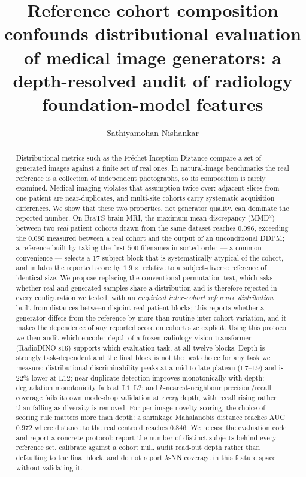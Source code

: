\documentclass[preprint,12pt,authoryear]{elsarticle}
\newcommand{\Lb}[1]{\ensuremath{\mathrm{L}#1}}
\begin{document}
\begin{frontmatter}

\title{Reference cohort composition confounds distributional evaluation of
       medical image generators: a depth-resolved audit of radiology
       foundation-model features}

\author[pdn]{Sathiyamohan Nishankar}
\address[pdn]{Department of Computer Engineering, University of Peradeniya,
              Peradeniya, Sri Lanka}

\begin{abstract}
Distributional metrics such as the Fr\'echet Inception Distance compare a set of
generated images against a finite set of real ones. In natural-image benchmarks
the real reference is a collection of independent photographs, so its
composition is rarely examined. Medical imaging violates that assumption twice
over: adjacent slices from one patient are near-duplicates, and multi-site
cohorts carry systematic acquisition differences. We show that these two
properties, not generator quality, can dominate the reported number. On BraTS
brain MRI, the maximum mean discrepancy (MMD$^2$) between two \emph{real}
patient cohorts drawn from the same dataset reaches $0.096$, exceeding the
$0.080$ measured between a real cohort and the output of an unconditional DDPM;
a reference built by taking the first $500$ filenames in sorted order --- a
common convenience --- selects a $17$-subject block that is systematically
atypical of the cohort, and inflates the reported score by $1.9\times$ relative
to a subject-diverse reference of identical size. We propose replacing the conventional permutation
test, which asks whether real and generated samples share a distribution and
is therefore rejected in every configuration we tested, with an \emph{empirical inter-cohort reference distribution} built from
distances between disjoint real patient blocks; this reports whether a
generator differs from the reference by more than routine inter-cohort
variation, and it makes the dependence of any reported score on cohort size
explicit. Using this protocol we then audit which encoder depth of a frozen
radiology vision transformer (RadioDINO-s16) supports which evaluation task, at
all twelve blocks. Depth is strongly task-dependent and the final block is not
the best choice for any task we measure: distributional discriminability peaks
at a mid-to-late plateau (\Lb{7}--\Lb{9}) and is $22\%$ lower at \Lb{12};
near-duplicate detection improves monotonically with depth; degradation
monotonicity fails at \Lb{1}--\Lb{2}; and $k$-nearest-neighbour precision/recall
coverage fails its own mode-drop validation at \emph{every} depth, with recall
rising rather than falling as diversity is removed. For per-image novelty
scoring, the choice of scoring rule matters more than depth: a shrinkage
Mahalanobis distance reaches AUC $0.972$ where distance to the real centroid
reaches $0.846$. We release the evaluation code and report a concrete protocol:
report the number of distinct subjects behind every reference set, calibrate
against a cohort null, audit read-out depth rather than defaulting to the final block, and do not
report $k$-NN coverage in this feature space without validating it.
\end{abstract}


\end{frontmatter}
\end{document}
